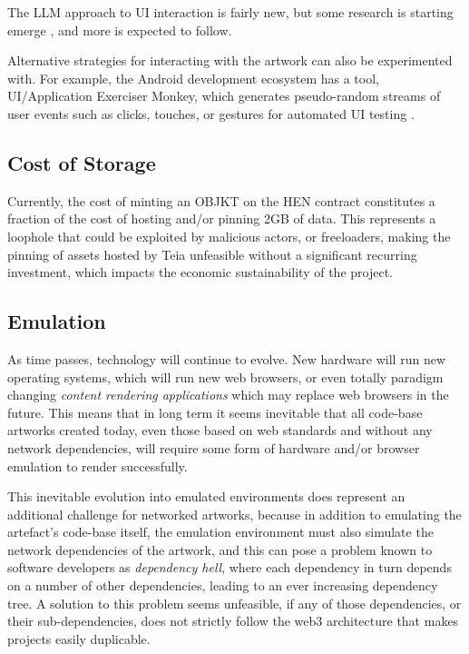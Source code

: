 The LLM approach to UI interaction is fairly new, but some research is starting emerge \cite{liuMakeLLMTesting2024}, and more is expected to follow.

Alternative strategies for interacting with the artwork can also be experimented with. For example, the Android development ecosystem has a tool, UI/Application Exerciser Monkey, which generates pseudo-random streams of user events such as clicks, touches, or gestures for automated UI testing \cite{UIApplicationExerciser}.

\subsection{Cost of Storage}

Currently, the cost of minting an OBJKT on the HEN contract constitutes a fraction of the cost of hosting and/or pinning 2GB of data. This represents a loophole that could be exploited by malicious actors, or freeloaders, making the pinning of assets hosted by Teia unfeasible without a significant recurring investment, which impacts the economic sustainability of the project.

\subsection{Emulation}

As time passes, technology will continue to evolve. New hardware will run new operating systems, which will run new web browsers, or even totally paradigm changing \emph{content rendering applications} which may replace web browsers in the future. This means that in long term it seems inevitable that all code-base artworks created today, even those based on web standards and without any network dependencies, will require some form of hardware and/or browser emulation to render successfully. 

This inevitable evolution into emulated environments does represent an additional challenge for networked artworks, because in addition to emulating the artefact's code-base itself, the emulation environment must also simulate the network dependencies of the artwork, and this can pose a problem known to software developers as \emph{dependency hell}, where each dependency in turn depends on a number of other dependencies, leading to an ever increasing dependency tree. A solution to this problem seems unfeasible, if any of those dependencies, or their sub-dependencies, does not strictly follow the web3 architecture that makes projects easily duplicable.

